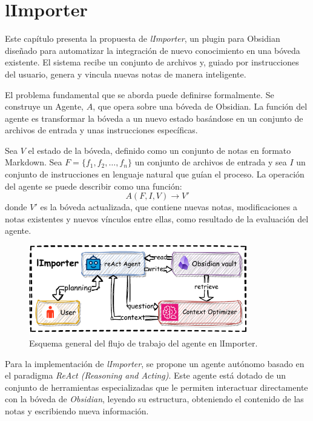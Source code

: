 \chapter{lImporter}\label{chapter:proposal}
Este capítulo presenta la propuesta de \textit{lImporter}, un plugin para Obsidian diseñado para automatizar la integración de nuevo conocimiento en una bóveda existente. El sistema recibe un conjunto de archivos y, guiado por instrucciones del usuario, genera y vincula nuevas notas de manera inteligente.

El problema fundamental que se aborda puede definirse formalmente. Se construye un Agente, $A$, que opera sobre una bóveda de Obsidian. La función del agente es transformar la bóveda a un nuevo estado basándose en un conjunto de archivos de entrada y unas instrucciones específicas.

Sea $V$ el estado de la bóveda, definido como un conjunto de notas en formato Markdown. Sea $F = \{f_1, f_2, \dots, f_n\}$ un conjunto de archivos de entrada y sea $I$ un conjunto de instrucciones en lenguaje natural que guían el proceso. La operación del agente se puede describir como una función:
\[ A(F, I, V) \rightarrow V' \]
donde $V'$ es la bóveda actualizada, que contiene nuevas notas, modificaciones a notas existentes y nuevos vínculos entre ellas, como resultado de la evaluación del agente.

\begin{figure}[h]
    \centering
    \includegraphics[width=0.85\textwidth]{figures/limporter.pdf}
    \caption{Esquema general del flujo de trabajo del agente en lImporter.}
    \label{fig:importer_schema}
\end{figure}

Para la implementación de \textit{lImporter}, se propone un agente autónomo basado en el paradigma \textit{ReAct (Reasoning and Acting)}. Este agente está dotado de un conjunto de herramientas especializadas que le permiten interactuar directamente con la bóveda de \textit{Obsidian}, leyendo su estructura, obteniendo el contenido de las notas y escribiendo nueva información.

